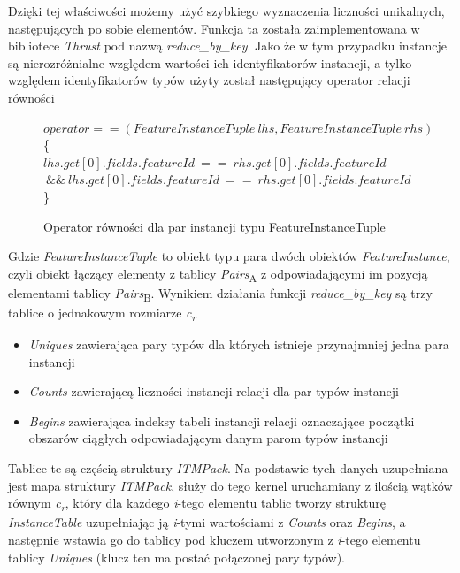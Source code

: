 \documentclass[12pt]{article}
\makeatletter
\newcounter{operator}
\newenvironment{operator}[1][htb]
  {
  \renewcommand*{\algorithmcfname}{Operator}%
  \let\c@algocf\c@operator
   \begin{algorithm}[#1]
  }
  {\end{algorithm}}
\makeatother
\begin{document}
Dzięki tej właściwości możemy użyć szybkiego wyznaczenia liczności unikalnych, następujących po sobie elementów. Funkcja ta została zaimplementowana w bibliotece \textit{Thrust} pod nazwą \textit{reduce\_by\_key}. Jako że w tym przypadku instancje są nierozróżnialne względem wartości ich identyfikatorów instancji, a tylko względem identyfikatorów typów użyty został następujący operator relacji równości

\begin{figure}[H]

\begin{operator}[H]
$operator==(FeatureInstanceTuple\ lhs,FeatureInstanceTuple\ rhs) $\\
\{\\
\Return $lhs.get[0].fields.featureId\ ==\ rhs.get[0].fields.featureId$\\
$\ \&\&\ lhs.get[0].fields.featureId\ ==\ rhs.get[0].fields.featureId$\\
\}
\caption{Operator równości dla par instancji typu FeatureInstanceTuple }
\end{operator}
\end{figure}

Gdzie \textit{FeatureInstanceTuple} to obiekt typu para dwóch obiektów \textit{FeatureInstance}, czyli obiekt łączący elementy z tablicy \textit{Pairs}\textsubscript{A} z odpowiadającymi im pozycją elementami tablicy \textit{Pairs}\textsubscript{B}.
Wynikiem działania funkcji \textit{reduce\_by\_key} są trzy tablice o jednakowym rozmiarze \textit{c\textsubscript{r}}
\begin{itemize}
\item \textit{Uniques} zawierająca pary typów dla których istnieje przynajmniej jedna para instancji
\item \textit{Counts} zawierającą liczności instancji relacji dla par typów instancji
\item \textit{Begins} zawierająca indeksy tabeli instancji relacji oznaczające początki obszarów ciągłych odpowiadającym danym parom typów instancji
\end{itemize}

Tablice te są częścią struktury \textit{ITMPack}. Na podstawie tych danych uzupełniana jest mapa struktury \textit{ITMPack}, służy do tego kernel uruchamiany z ilością wątków równym \textit{c\textsubscript{r}}, który dla każdego \textit{i}-tego elementu tablic tworzy strukturę \textit{InstanceTable} uzupełniając ją \textit{i}-tymi wartościami z \textit{Counts} oraz \textit{Begins}, a następnie wstawia go do tablicy pod kluczem utworzonym z \textit{i}-tego elementu tablicy \textit{Uniques} (klucz ten ma postać połączonej pary typów).
\end{document}
